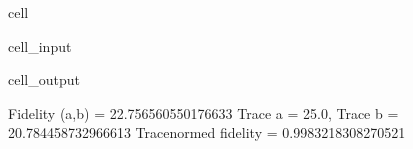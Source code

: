 \documentclass[letterpaper,table,10pt,english]{jupyterBook}
\begin{document}
\begin{sphinxuseclass}{cell}\begin{sphinxVerbatimInput}

\begin{sphinxuseclass}{cell_input}
\begin{sphinxVerbatim}[commandchars=\\\{\}]
\end{sphinxVerbatim}

\end{sphinxuseclass}\end{sphinxVerbatimInput}
\begin{sphinxVerbatimOutput}

\begin{sphinxuseclass}{cell_output}
\begin{sphinxVerbatim}[commandchars=\\\{\}]
Fidelity (a,b) = 22.756560550176633
Trace a = 25.0, Trace b = 20.784458732966613
Trace\PYGZhy{}normed fidelity = 0.9983218308270521
\end{sphinxVerbatim}

\end{sphinxuseclass}\end{sphinxVerbatimOutput}

\end{sphinxuseclass}
\end{document}
